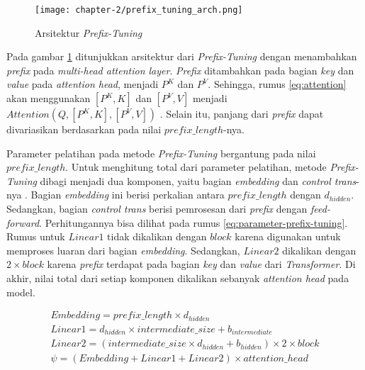 \begin{figure}[h]
    \vspace{0.25cm}
    \centering
    \texttt{[image: chapter-2/prefix\_tuning\_arch.png]}
    \caption{Arsitektur \textit{Prefix-Tuning} \parencite{adapterhub}}
    \label{fig:prefix_tuning_arch}
\end{figure}

Pada gambar \ref{fig:prefix_tuning_arch} ditunjukkan arsitektur dari \textit{Prefix-Tuning} dengan menambahkan \textit{prefix} pada \textit{multi-head attention layer}. \textit{Prefix} ditambahkan pada bagian \textit{key} dan \textit{value} pada \textit{attention head}, menjadi $P^K$ dan $P^V$. Sehingga, rumus \ref{eq:attention} akan menggunakan $[P^K, K]$ dan $[P^V, V]$ menjadi $Attention(Q, [P^K, K], [P^V, V])$ \parencite{adapterhub}. Selain itu, panjang dari \textit{prefix} dapat divariasikan berdasarkan pada nilai $prefix\_length$-nya. 

Parameter pelatihan pada metode \textit{Prefix-Tuning} bergantung pada nilai $prefix\_length$. Untuk menghitung total dari parameter pelatihan, metode \textit{Prefix-Tuning} dibagi menjadi dua komponen, yaitu bagian \textit{embedding} dan \textit{control trans}-nya \parencite{adapters}. Bagian \textit{embedding} ini berisi perkalian antara $prefix\_length$ dengan $d_{hidden}$. Sedangkan, bagian \textit{control trans} berisi pemrosesan dari \textit{prefix} dengan \textit{feed-forward}. Perhitungannya bisa dilihat pada rumus \ref{eq:parameter-prefix-tuning}. Rumus untuk $Linear1$ tidak dikalikan dengan $block$ karena digunakan untuk memproses luaran dari bagian \textit{embedding}. Sedangkan, $Linear2$ dikalikan dengan $2\times{block}$ karena \textit{prefix} terdapat pada bagian \textit{key} dan \textit{value} dari \textit{Transformer}. Di akhir, nilai total dari setiap komponen dikalikan sebanyak \textit{attention head} pada model.

\begin{equation}
    \begin{aligned}
        Embedding = prefix\_length \times d_{hidden} \\
        Linear1 = d_{hidden} \times intermediate\_size + b_{intermediate} \\
        Linear2 = (intermediate\_size \times d_{hidden} + b_{hidden}) \times 2 \times block \\
        \psi = (Embedding + Linear1 + Linear2) \times attention\_head
    \end{aligned}
    \label{eq:parameter-prefix-tuning}
\end{equation}

